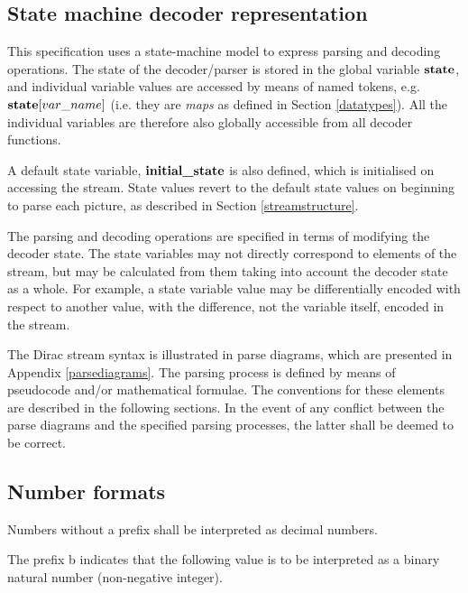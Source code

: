 
\subsection{State machine decoder representation}

This specification uses a state-machine model to express parsing and
decoding operations. The state of the decoder/parser is stored in the
global variable $\textbf{state}$, and individual variable values are accessed
by means of named tokens, e.g. $\textbf{state}[var\_name]$ (i.e. they
are {\em maps} as defined in Section \ref{datatypes}). All the individual
variables are therefore also globally accessible from all decoder functions.

A default state variable, $\textbf{initial\_state}$ is also defined, which is
initialised on accessing the stream. State values revert to the default
state values on beginning to parse each picture, as described in 
Section \ref{streamstructure}.

The parsing and decoding operations are specified in terms of modifying
the decoder state. The state variables may not directly correspond
to elements of the stream, but may be calculated from them taking into
account the decoder state as a whole. For example, a state variable value 
may be differentially encoded with respect to another value, with the
difference, not the variable itself, encoded in the stream. 

The Dirac stream syntax is illustrated in parse diagrams, which 
are presented in Appendix \ref{parsediagrams}. The parsing process
is defined by means of pseudocode and/or mathematical formulae. The
conventions for these elements are described in the following sections.
In the event of any conflict between the parse diagrams and the specified
parsing processes, the latter shall be deemed to be correct.

\subsection{Number formats}
\label{mathnotation}

Numbers without a prefix shall be interpreted as decimal numbers.

The prefix b indicates that the following value is to be interpreted as a binary
natural number (non-negative integer). 

